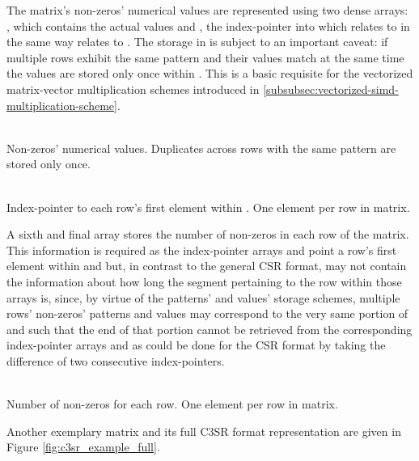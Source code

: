 \documentclass{article}
\begin{document}
    The matrix's non-zeros' numerical values are represented using two dense arrays: \V, which contains the actual values and \VS, the index-pointer into \V which relates to \V in the same way \JS relates to \J. The storage in \V is subject to an important caveat: if multiple rows exhibit the same pattern and their values match at the same time the values are stored only once within \V. This is a basic requisite for the vectorized matrix-vector multiplication schemes introduced in \ref{subsubsec:vectorized-simd-multiplication-scheme}.

    \begin{description}[align = left, labelwidth = 4cm]
      \item [\V - \emph{Values}] \hfill \\
        Non-zeros' numerical values. Duplicates across rows with the same pattern are stored only once.
      \item [\VS - \emph{Values' index-pointers}] \hfill \\
        Index-pointer to each row's first element within \V. One element per row in matrix.
    \end{description}

    A sixth and final array \RS stores the number of non-zeros in each row of the matrix. This information is required as the index-pointer arrays \JS and \VS point a row's first element within \J and \V but, in contrast to the general CSR format, may not contain the information about how long the segment pertaining to the row within those arrays is, since, by virtue of the patterns' and values' storage schemes, multiple rows' non-zeros' patterns and values may correspond to the very same portion of \J and \V such that the end of that portion cannot be retrieved from the corresponding index-pointer arrays \JS and \VS as could be done for the CSR format by taking the difference of two consecutive index-pointers.

    \begin{description}[align = left, labelwidth = 4cm]
      \item [\RS - \emph{Row sizes}] \hfill \\
        Number of non-zeros for each row. One element per row in matrix.
    \end{description}

    Another exemplary matrix and its full C3SR format representation are given in Figure \ref{fig:c3sr_example_full}.
\end{document}
